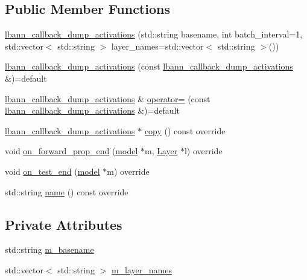 \subsection*{Public Member Functions}
\begin{DoxyCompactItemize}
\item 
\hyperlink{classlbann_1_1lbann__callback__dump__activations_a96d1412d4b29cab747bb0c1cfccd8a87}{lbann\+\_\+callback\+\_\+dump\+\_\+activations} (std\+::string basename, int batch\+\_\+interval=1, std\+::vector$<$ std\+::string $>$ layer\+\_\+names=std\+::vector$<$ std\+::string $>$())
\item 
\hyperlink{classlbann_1_1lbann__callback__dump__activations_ad0a0a3ceb5c70c59fb334bd583ed7821}{lbann\+\_\+callback\+\_\+dump\+\_\+activations} (const \hyperlink{classlbann_1_1lbann__callback__dump__activations}{lbann\+\_\+callback\+\_\+dump\+\_\+activations} \&)=default
\item 
\hyperlink{classlbann_1_1lbann__callback__dump__activations}{lbann\+\_\+callback\+\_\+dump\+\_\+activations} \& \hyperlink{classlbann_1_1lbann__callback__dump__activations_a27665cb0bc6f0f05a3d8b54a588f98ff}{operator=} (const \hyperlink{classlbann_1_1lbann__callback__dump__activations}{lbann\+\_\+callback\+\_\+dump\+\_\+activations} \&)=default
\item 
\hyperlink{classlbann_1_1lbann__callback__dump__activations}{lbann\+\_\+callback\+\_\+dump\+\_\+activations} $\ast$ \hyperlink{classlbann_1_1lbann__callback__dump__activations_a172d03a30d8c8852d910db220b928557}{copy} () const override
\item 
void \hyperlink{classlbann_1_1lbann__callback__dump__activations_acf4429a44ead6ffea303528618bc6572}{on\+\_\+forward\+\_\+prop\+\_\+end} (\hyperlink{classlbann_1_1model}{model} $\ast$m, \hyperlink{classlbann_1_1Layer}{Layer} $\ast$l) override
\item 
void \hyperlink{classlbann_1_1lbann__callback__dump__activations_a5c93f4455b743e3f61600bf092a6d93c}{on\+\_\+test\+\_\+end} (\hyperlink{classlbann_1_1model}{model} $\ast$m) override
\item 
std\+::string \hyperlink{classlbann_1_1lbann__callback__dump__activations_adc6a741a2ef667a5969ddbb8ec159163}{name} () const override
\end{DoxyCompactItemize}
\subsection*{Private Attributes}
\begin{DoxyCompactItemize}
\item 
std\+::string \hyperlink{classlbann_1_1lbann__callback__dump__activations_a5775d9317de386e07cbd137122db6ee6}{m\+\_\+basename}
\item 
std\+::vector$<$ std\+::string $>$ \hyperlink{classlbann_1_1lbann__callback__dump__activations_aac56e32b6bef7923046c408f3a2dc857}{m\+\_\+layer\+\_\+names}
\end{DoxyCompactItemize}
